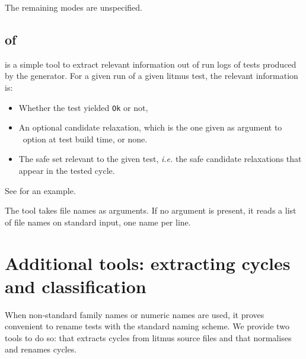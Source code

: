 The remaining modes are unspecified.

\subsection{ of \readRelax}
\readRelax{} is a simple tool to extract relevant information
out of \litmus{} run logs of tests produced by the \diy{} generator.
For a given run of a given litmus test, the relevant information is:
\begin{itemize}
\item Whether the test yielded \texttt{Ok} or not,
\item An optional candidate relaxation, which is the one
given as argument to \diy~option
 at test build time, or none.
\item The safe set relevant to the given test, \emph{i.e.}
the safe candidate relaxations that appear in the tested cycle.
\end{itemize}
See \mysec{\ref{readRelax:intro}} for an example.

The tool \readRelax{} takes file names as arguments.
If no argument is present, it reads a list
of file names on standard input, one name per line.

\section{Additional tools: extracting cycles and classification}
When non-standard family names or numeric names are used, it proves convenient
to rename tests with the standard naming scheme.
We provide two tools to do so: \mcycles{} that extracts cycles from
litmus source files and \classify{} that normalises and renames cycles.

